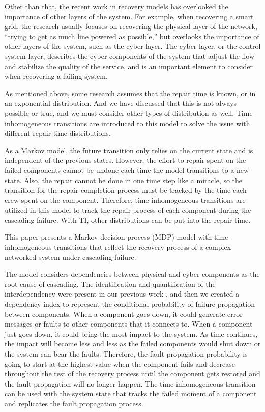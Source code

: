 \documentclass[runningheads]{llncs}
\begin{document}
Other than that, the recent work in recovery models has overlooked the importance of other layers of the system. For example, when recovering a smart grid, the research usually focuses on recovering the physical layer of the network, ``trying to get as much line powered as possible,'' but overlooks the importance of other layers of the system, such as the cyber layer. The cyber layer, or the control system layer, describes the cyber components of the system that adjust the flow and stabilize the quality of the service, and is an important element to consider when recovering a failing system.

As mentioned above, some research assumes that the repair time is known, or in an exponential distribution. And we have discussed that this is not always possible or true, and we must consider other types of distribution as well. Time-inhomogeneous transitions are introduced to this model to solve the issue with different repair time distributions. 

As a Markov model, the future transition only relies on the current state and is independent of the previous states. However, the effort to repair spent on the failed components cannot be undone each time the model transitions to a new state. Also, the repair cannot be done in one time step like a miracle, so the transition for the repair completion process must be tracked by the time each crew spent on the component. Therefore, time-inhomogeneous transitions are utilized in this model to track the repair process of each component during the cascading failure. With TI, other distributions can be put into the repair time.

This paper presents a Markov decision process (MDP) model with time-inhomogeneous transitions that reflect the recovery process of a complex networked system under cascading failure. 

The model considers dependencies between physical and cyber components as the root cause of cascading. The identification and quantification of the interdependency were present in our previous work \cite{marashi_identification_2021}, and then we created a dependency index to represent the conditional probability of failure propagation between components. When a component goes down, it could generate error messages or faults to other components that it connects to. When a component just goes down, it could bring the most impact to the system. As time continues, the impact will become less and less as the failed components would shut down or the system can bear the faults. Therefore, the fault propagation probability is going to start at the highest value when the component fails and decrease throughout the rest of the recovery process until the component gets restored and the fault propagation will no longer happen. The time-inhomogeneous transition can be used with the system state that tracks the failed moment of a component and replicates the fault propagation process. 
\end{document}
